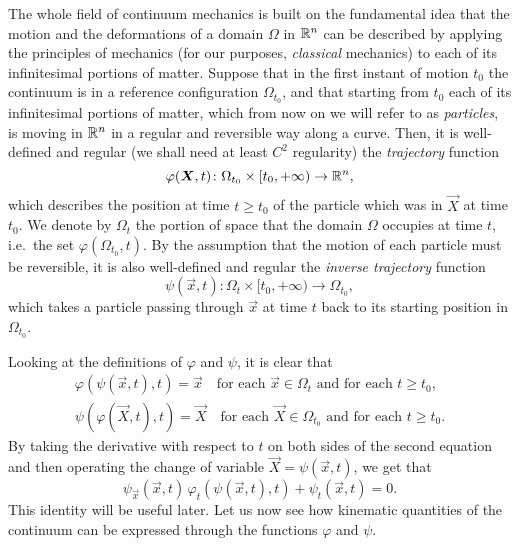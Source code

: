 The whole field of continuum mechanics is built on the fundamental idea that
the motion and the deformations of a domain $\Omega$ in $\mathbb{R}^n$
can be described by applying the principles of mechanics (for our purposes,
\emph{classical} mechanics) to each of its infinitesimal portions of matter.
Suppose that in the first instant of motion $t_0$ the continuum is
in a reference configuration $\Omega_{t_0}$, and that starting from
$t_0$ each of its infinitesimal portions of matter, which from
now on we will refer to as \emph{particles}, is moving in $\mathbb{R}^n$
in a regular and reversible way along a curve. Then, it is well-defined
and regular (we shall need at least $C^2$ regularity)
the \emph{trajectory} function
\[
\varphi(\bm{X},t) \colon \Omega_{t_0} \times [t_0,+\infty) \to \mathbb{R}^n,
\]
which describes the position at time $t \geq t_0$ of the particle which
was in $\vec{X}$ at time $t_0$. We denote by $\Omega_t$ the portion
of space that the domain $\Omega$ occupies at time $t$,
i.e.\ the set $\varphi(\Omega_{t_0},t)$.
By the assumption that the motion of each particle must be reversible,
it is also well-defined and regular the \emph{inverse trajectory} function
\[
\psi(\vec{x},t) \colon \Omega_t \times [t_0,+\infty) \to \Omega_{t_0},
\]
which takes a particle passing through $\vec{x}$ at time $t$ back
to its starting position in $\Omega_{t_0}$.

Looking at the definitions of $\varphi$ and $\psi$, it is clear that
\begin{gather*}
\varphi(\psi(\vec{x},t),t) = \vec{x}
\quad \text{for each $\vec{x} \in \Omega_t$ and for each $t \geq t_0$,} \\
\psi(\varphi(\vec{X},t),t) = \vec{X}
\quad \text{for each $\vec{X} \in \Omega_{t_0}$ and for each $t \geq t_0$.}
\end{gather*}
By taking the derivative with respect to $t$ on both sides
of the second equation and then operating the change of variable
$\vec{X} = \psi(\vec{x},t)$, we get that
\begin{equation} \label{eq:phi-psi-funzione-inversa}
\psi_{\vec{x}}(\vec{x},t) \, \varphi_t(\psi(\vec{x},t),t) + \psi_t(\vec{x},t) = 0.
\end{equation}
This identity will be useful later. Let us now see how kinematic quantities
of the continuum can be expressed through the functions $\varphi$ and $\psi$.

